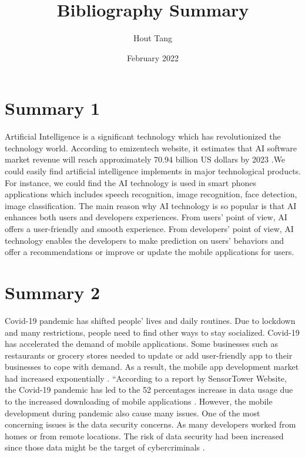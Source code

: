 \documentclass{article}
\title{Bibliography Summary}
\author{Hout Tang}
\date{February 2022}
\begin{document}
\maketitle

\section*{Summary 1}
Artificial Intelligence is a significant technology which has revolutionized the technology world. According to emizentech website, it estimates that AI software market revenue will reach approximately 70.94 billion US dollars by 2023 \cite{nagarArticle}
 .We could easily find artificial intelligence implements in major technological products. For instance, we could find the AI technology is used in smart phones applications which includes speech recognition, image recognition, face detection, image classification. The main reason why AI technology is so popular is that AI enhances both users and developers experiences. From users’ point of view, AI offers a user-friendly and smooth experience. From developers’ point of view, AI technology enables the developers to make prediction on users’ behaviors and offer a recommendations or improve or update the mobile applications for users. 




\medskip

\section*{Summary 2}

Covid-19 pandemic has shifted people’ lives and daily routines. Due to lockdown and many restrictions, people need to find other ways to stay socialized. Covid-19 has accelerated the demand of mobile applications. Some businesses such as restaurants or grocery stores needed to update or add user-friendly app to their businesses to cope with demand. As a result, the mobile app development market had increased exponentially \cite{medini2020ramping}. “According to a report by SensorTower Website, the Covid-19 pandemic has led to the 52 percentages increase in data usage due to the increased downloading of mobile applications \cite{TkaArticle}. However, the mobile development during pandemic also cause many issues. One of the most concerning issues is the data security concerns. As many developers worked from homes or from remote locations. The risk of data security had been increased since those data might be the target of cybercriminals \cite{medini2020ramping}.





\printbibliography
\end{document}
